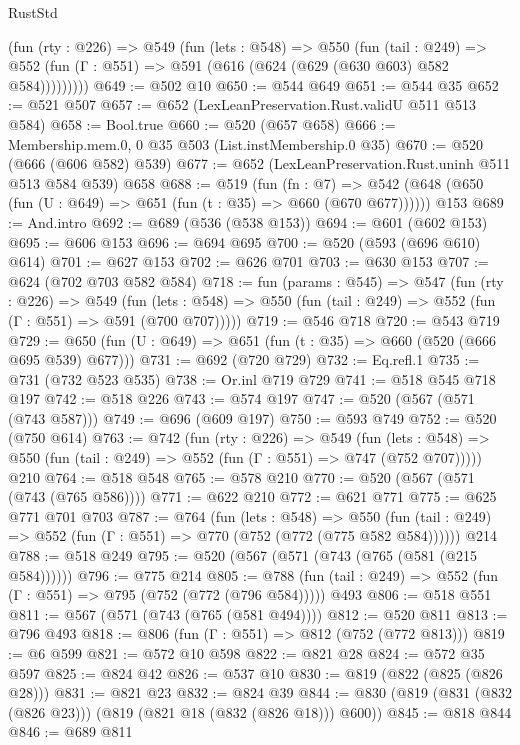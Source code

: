 \begin{lexlean}{RustStd}
\begin{coremodule}
        (fun (rty : @226) =>
        @549
          (fun (lets : @548) =>
          @550
            (fun (tail : @249) =>
            @552 (fun (Γ : @551) => @591 (@616 (@624 (@629 (@630 @603) @582 @584)))))))))
@649 := @502 @10
@650 := @544 @649
@651 := @544 @35
@652 := @521 @507
@657 := @652 (LexLeanPreservation.Rust.validU @511 @513 @584)
@658 := Bool.true
@660 := @520 (@657 @658)
@666 := Membership.mem.{0, 0} @35 @503 (List.instMembership.{0} @35)
@670 := @520 (@666 (@606 @582) @539)
@677 := @652 (LexLeanPreservation.Rust.uninh @511 @513 @584 @539) @658
@688 := @519
    (fun (fn : @7) =>
    @542 (@648 (@650 (fun (U : @649) => @651 (fun (t : @35) => @660 (@670 @677))))))
    @153
@689 := And.intro
@692 := @689 (@536 (@538 @153))
@694 := @601 (@602 @153)
@695 := @606 @153
@696 := @694 @695
@700 := @520 (@593 (@696 @610) @614)
@701 := @627 @153
@702 := @626 @701
@703 := @630 @153
@707 := @624 (@702 @703 @582 @584)
@718 := fun (params : @545) =>
  @547
    (fun (rty : @226) =>
    @549
      (fun (lets : @548) => @550 (fun (tail : @249) => @552 (fun (Γ : @551) => @591 (@700 @707)))))
@719 := @546 @718
@720 := @543 @719
@729 := @650 (fun (U : @649) => @651 (fun (t : @35) => @660 (@520 (@666 @695 @539) @677)))
@731 := @692 (@720 @729)
@732 := Eq.refl.{1}
@735 := @731 (@732 @523 @535)
@738 := Or.inl @719 @729
@741 := @518 @545 @718 @197
@742 := @518 @226
@743 := @574 @197
@747 := @520 (@567 (@571 (@743 @587)))
@749 := @696 (@609 @197)
@750 := @593 @749
@752 := @520 (@750 @614)
@763 := @742
    (fun (rty : @226) =>
    @549
      (fun (lets : @548) => @550 (fun (tail : @249) => @552 (fun (Γ : @551) => @747 (@752 @707)))))
    @210
@764 := @518 @548
@765 := @578 @210
@770 := @520 (@567 (@571 (@743 (@765 @586))))
@771 := @622 @210
@772 := @621 @771
@775 := @625 @771 @701 @703
@787 := @764
    (fun (lets : @548) =>
    @550 (fun (tail : @249) => @552 (fun (Γ : @551) => @770 (@752 (@772 (@775 @582 @584))))))
    @214
@788 := @518 @249
@795 := @520 (@567 (@571 (@743 (@765 (@581 (@215 @584))))))
@796 := @775 @214
@805 := @788 (fun (tail : @249) => @552 (fun (Γ : @551) => @795 (@752 (@772 (@796 @584))))) @493
@806 := @518 @551
@811 := @567 (@571 (@743 (@765 (@581 @494))))
@812 := @520 @811
@813 := @796 @493
@818 := @806 (fun (Γ : @551) => @812 (@752 (@772 @813)))
@819 := @6 @599
@821 := @572 @10 @598
@822 := @821 @28
@824 := @572 @35 @597
@825 := @824 @42
@826 := @537 @10
@830 := @819 (@822 (@825 (@826 @28)))
@831 := @821 @23
@832 := @824 @39
@844 := @830 (@819 (@831 (@832 (@826 @23))) (@819 (@821 @18 (@832 (@826 @18))) @600))
@845 := @818 @844
@846 := @689 @811

\end{coremodule}
\end{lexlean}
